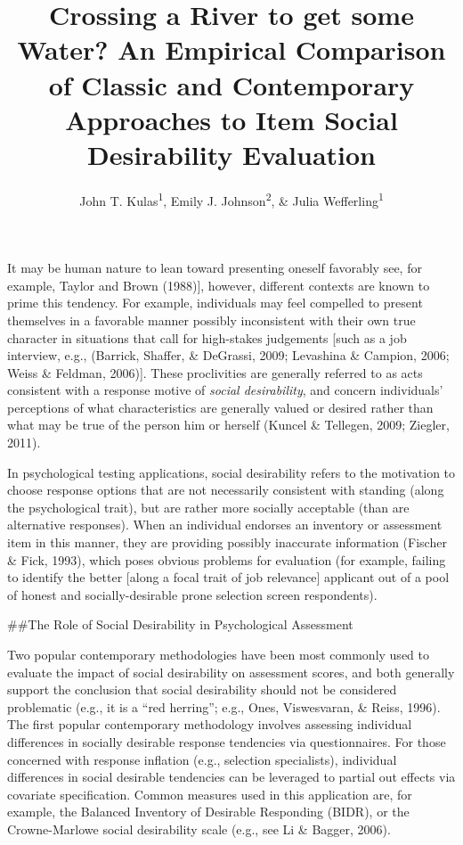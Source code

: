 \documentclass[
  english,
  ,jou]{apa6}
\title{Crossing a River to get some Water? An Empirical Comparison of Classic and Contemporary Approaches to Item Social Desirability Evaluation}
\author{John T. Kulas\textsuperscript{1}, Emily J. Johnson\textsuperscript{2}, \& Julia Wefferling\textsuperscript{1}}
\date{}
\affiliation{\vspace{0.5cm}\textsuperscript{1} Montclair State University\\\textsuperscript{2} St.~Cloud State University}
\begin{document}
\maketitle

It may be human nature to lean toward presenting oneself favorably see, for example, Taylor and Brown (1988){]}, however, different contexts are known to prime this tendency. For example, individuals may feel compelled to present themselves in a favorable manner possibly inconsistent with their own true character in situations that call for high-stakes judgements {[}such as a job interview, e.g., (Barrick, Shaffer, \& DeGrassi, 2009; Levashina \& Campion, 2006; Weiss \& Feldman, 2006){]}. These proclivities are generally referred to as acts consistent with a response motive of \emph{social desirability}, and concern individuals' perceptions of what characteristics are generally valued or desired rather than what may be true of the person him or herself (Kuncel \& Tellegen, 2009; Ziegler, 2011).

In psychological testing applications, social desirability refers to the motivation to choose response options that are not necessarily consistent with standing (along the psychological trait), but are rather more socially acceptable (than are alternative responses). When an individual endorses an inventory or assessment item in this manner, they are providing possibly inaccurate information (Fischer \& Fick, 1993), which poses obvious problems for evaluation (for example, failing to identify the better {[}along a focal trait of job relevance{]} applicant out of a pool of honest and socially-desirable prone selection screen respondents).

\#\#The Role of Social Desirability in Psychological Assessment

Two popular contemporary methodologies have been most commonly used to evaluate the impact of social desirability on assessment scores, and both generally support the conclusion that social desirability should not be considered problematic (e.g., it is a ``red herring''; e.g., Ones, Viswesvaran, \& Reiss, 1996). The first popular contemporary methodology involves assessing individual differences in socially desirable response tendencies via questionnaires. For those concerned with response inflation (e.g., selection specialists), individual differences in social desirable tendencies can be leveraged to partial out effects via covariate specification. Common measures used in this application are, for example, the Balanced Inventory of Desirable Responding (BIDR), or the Crowne-Marlowe social desirability scale (e.g., see Li \& Bagger, 2006).
\end{document}
